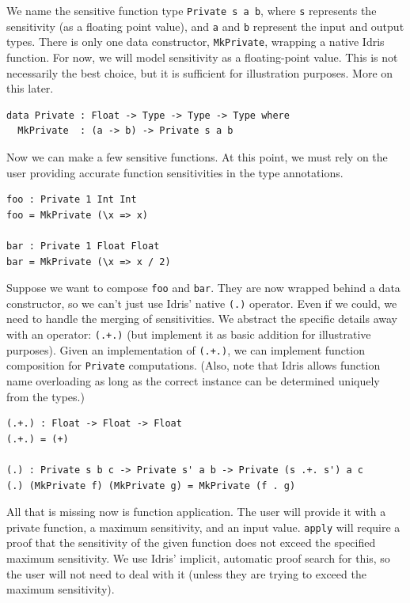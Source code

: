 \documentclass[12pt]{article}
\begin{document}
We name the sensitive function type \texttt{Private s a b}, where \texttt{s} represents the sensitivity (as a floating point value), and \texttt{a} and \texttt{b} represent the input and output types.
There is only one data constructor, \texttt{MkPrivate}, wrapping a native Idris function.
For now, we will model sensitivity as a floating-point value.
This is not necessarily the best choice, but it is sufficient for illustration purposes.
More on this later.

\begin{lstlisting}[caption="Sensitive functions in Idris"]
data Private : Float -> Type -> Type -> Type where
  MkPrivate  : (a -> b) -> Private s a b
\end{lstlisting}

Now we can make a few sensitive functions.
At this point, we must rely on the user providing accurate function sensitivities in the type annotations.

\begin{lstlisting}[caption="Simple examples of sensitive functions"]
foo : Private 1 Int Int
foo = MkPrivate (\x => x)

bar : Private 1 Float Float
bar = MkPrivate (\x => x / 2)
\end{lstlisting}

Suppose we want to compose \texttt{foo} and \texttt{bar}.
They are now wrapped behind a data constructor, so we can't just use Idris' native \texttt{(.)} operator.
Even if we could, we need to handle the merging of sensitivities.
We abstract the specific details away with an operator: \texttt{(.+.)} (but implement it as basic addition for illustrative purposes).
Given an implementation of \texttt{(.+.)}, we can implement function composition for \texttt{Private} computations.
(Also, note that Idris allows function name overloading as long as the correct instance can be determined uniquely from the types.)

\begin{lstlisting}[caption=Composing function sensitivity]
(.+.) : Float -> Float -> Float
(.+.) = (+)

(.) : Private s b c -> Private s' a b -> Private (s .+. s') a c
(.) (MkPrivate f) (MkPrivate g) = MkPrivate (f . g)
\end{lstlisting}

All that is missing now is function application.
The user will provide it with a private function, a maximum sensitivity, and an input value.
\texttt{apply} will require a proof that the sensitivity of the given function does not exceed the specified maximum sensitivity.
We use Idris' implicit, automatic proof search for this, so the user will not need to deal with it (unless they are trying to exceed the maximum sensitivity).
\end{document}
